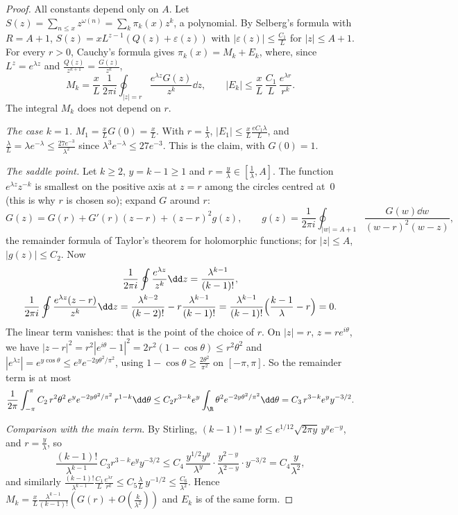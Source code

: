 \begin{proof}
All constants depend only on $A$. Let $S(z)=\sum_{n\le x}z^{\omega(n)}=\sum_k\pi_k(x)z^k$, a polynomial. By Selberg's formula with $R=A+1$, $S(z)=xL^{z-1}(Q(z)+\varepsilon(z))$ with $|\varepsilon(z)|\le\frac{C_1}L$ for $|z|\le A+1$. For every $r>0$, Cauchy's formula gives $\pi_k(x)=M_k+E_k$, where, since $L^z=e^{\lambda z}$ and $\frac{Q(z)}{z^{k+1}}=\frac{G(z)}{z^k}$,
\[
M_k=\frac xL\,\frac1{2\pi i}\oint_{|z|=r}\frac{e^{\lambda z}G(z)}{z^k}\dd z,\qquad|E_k|\le\frac xL\,\frac{C_1}L\,\frac{e^{\lambda r}}{r^k}.
\]
The integral $M_k$ does not depend on $r$.

\emph{The case $k=1$.} $M_1=\frac xLG(0)=\frac xL$. With $r=\frac1\lambda$, $|E_1|\le\frac xL\frac{eC_1\lambda}L$, and $\frac\lambda L=\lambda e^{-\lambda}\le\frac{27e^{-3}}{\lambda^2}$ since $\lambda^3e^{-\lambda}\le27e^{-3}$. This is the claim, with $G(0)=1$.

\emph{The saddle point.} Let $k\ge2$, $y=k-1\ge1$ and $r=\frac y\lambda\in[\frac1\lambda,A]$. The function $e^{\lambda z}z^{-k}$ is smallest on the positive axis at $z=r$ among the circles centred at~$0$ (this is why $r$ is chosen so); expand $G$ around $r$:
\[
G(z)=G(r)+G'(r)(z-r)+(z-r)^2g(z),\qquad g(z)=\frac1{2\pi i}\oint_{|w|=A+1}\frac{G(w)\dd w}{(w-r)^2(w-z)},
\]
the remainder formula of Taylor's theorem for holomorphic functions; for $|z|\le A$, $|g(z)|\le C_2$. Now
\[
\begin{gathered}\frac1{2\pi i}\oint\frac{e^{\lambda z}}{z^k}\dd z=\frac{\lambda^{k-1}}{(k-1)!},\\\frac1{2\pi i}\oint\frac{e^{\lambda z}(z-r)}{z^k}\dd z=\frac{\lambda^{k-2}}{(k-2)!}-r\frac{\lambda^{k-1}}{(k-1)!}=\frac{\lambda^{k-1}}{(k-1)!}\Bigl(\frac{k-1}\lambda-r\Bigr)=0.\end{gathered}
\]
The linear term vanishes: that is the point of the choice of $r$. On $|z|=r$, $z=re^{i\theta}$, we have $|z-r|^2=r^2|e^{i\theta}-1|^2=2r^2(1-\cos\theta)\le r^2\theta^2$ and $|e^{\lambda z}|=e^{y\cos\theta}\le e^{y}e^{-2y\theta^2/\pi^2}$, using $1-\cos\theta\ge\frac{2\theta^2}{\pi^2}$ on $[-\pi,\pi]$. So the remainder term is at most
\[
\frac1{2\pi}\int_{-\pi}^\pi C_2\,r^2\theta^2\,e^ye^{-2y\theta^2/\pi^2}\,r^{1-k}\dd\theta\le C_2r^{3-k}e^y\int_{\R}\theta^2e^{-2y\theta^2/\pi^2}\dd\theta=C_3\,r^{3-k}e^yy^{-3/2}.
\]

\emph{Comparison with the main term.} By Stirling, $(k-1)!=y!\le e^{1/12}\sqrt{2\pi y}\,y^ye^{-y}$, and $r=\frac y\lambda$, so
\[
\frac{(k-1)!}{\lambda^{k-1}}\,C_3r^{3-k}e^yy^{-3/2}\le C_4\,\frac{y^{1/2}y^y}{\lambda^y}\cdot\frac{y^{2-y}}{\lambda^{2-y}}\cdot y^{-3/2}=C_4\frac y{\lambda^2},
\]
and similarly $\frac{(k-1)!}{\lambda^{k-1}}\frac{C_1}L\frac{e^{\lambda r}}{r^k}\le C_5\frac{\lambda}{L}\,y^{-1/2}\le\frac{C_6}{\lambda^2}$. Hence $M_k=\frac xL\frac{\lambda^{k-1}}{(k-1)!}(G(r)+O(\frac k{\lambda^2}))$ and $E_k$ is of the same form.
\end{proof}

